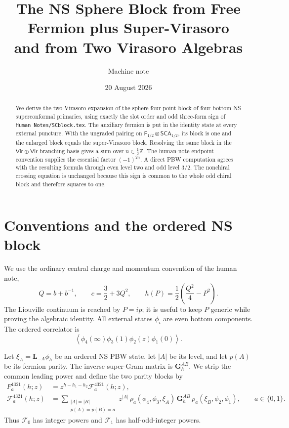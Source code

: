 \documentclass[11pt]{article}
\title{The NS Sphere Block from Free Fermion plus Super-Virasoro\\
and from Two Virasoro Algebras}
\author{Machine note}
\date{20 August 2026}
\newcommand{\SCA}{\mathsf{SCA}}
\newcommand{\Ff}{\mathsf F}
\newcommand{\Vir}{\mathsf{Vir}}
\newcommand{\cF}{\mathcal F}
\begin{document}
\maketitle

\begin{abstract}
We derive the two-Virasoro expansion of the sphere four-point block of four
bottom NS superconformal primaries, using exactly the slot order and odd
three-form sign of \texttt{Human Notes/SCblock.tex}.  The auxiliary fermion is
put in the identity state at every external puncture.  With the ungraded
pairing on \(\Ff_{1/2}\otimes\SCA_{1/2}\), its block is one and the enlarged
block equals the super-Virasoro block.  Resolving the same block in the
\(\Vir\oplus\Vir\) branching basis gives a sum over
\(n\in\frac12\mathbb Z\).  The human-note endpoint convention supplies the
essential factor \((-1)^{2n}\).  A direct PBW computation agrees with the resulting formula
through even level two and odd level \(3/2\).  The nonchiral crossing equation
is unchanged because this sign is common to the whole odd chiral block and
therefore squares to one.
\end{abstract}

\section{Conventions and the ordered NS block}

We use the ordinary central charge and momentum convention of the human note,
\begin{equation}
 Q=b+b^{-1},\qquad
 c=\frac32+3Q^2,\qquad
 h(P)=\frac12\left(\frac{Q^2}{4}-P^2\right).
 \label{eq:sca-parameters}
\end{equation}
The Liouville continuum is reached by \(P=i p\); it is useful to keep \(P\)
generic while proving the algebraic identity.  All external states
\(\phi_i\) are even bottom components.  The ordered correlator is
\begin{equation}
 \left\langle
 \phi_4(\infty)\phi_3(1)\phi_2(z)\phi_1(0)
 \right\rangle .
 \label{eq:ordered-correlator}
\end{equation}

Let \(\xi_A=\mathbf L_{-A}\phi_h\) be an ordered NS PBW state, let
\(|A|\) be its level, and let \(p(A)\) be its fermion parity.  The inverse
super-Gram matrix is \(\mathbf G_h^{AB}\).  We strip the common leading
power and define the two parity blocks by
\begin{align}
 F_a^{4321}(h;z)
 &=z^{h-h_1-h_2}\cF_a^{4321}(h;z),
 \nonumber\\
 \cF_a^{4321}(h;z)
 &=\sum_{\substack{|A|=|B|\\p(A)=p(B)=a}}
 z^{|A|}\,
 \rho_a(\phi_4,\phi_3,\xi_A)\,
 \mathbf G_h^{AB}\,
 \rho_a(\xi_B,\phi_2,\phi_1),
 \qquad a\in\{0,1\}.
 \label{eq:sca-block-definition}
\end{align}
Thus \(\cF_0\) has integer powers and \(\cF_1\) has half-odd-integer
powers.
\end{document}

